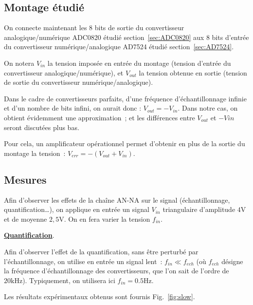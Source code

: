 \documentclass{article}
\begin{document}
\subsection{Montage étudié}

On connecte maintenant les 8 bits de sortie du convertisseur analogique/numérique ADC0820 étudié section~\ref{sec:ADC0820} aux 8 bits d'entrée du convertisseur numérique/analogique AD7524 étudié section~\ref{sec:AD7524}.

On notera $V_{in}$ la tension imposée en entrée du montage (tension d'entrée du convertisseur analogique/numérique), et $V_{out}$ la tension obtenue en sortie (tension de sortie du convertisseur numérique/analogique). 

Dans le cadre de convertisseurs parfaits, d'une fréquence d'échantillonnage infinie et d'un nombre de bits infini, on aurait donc : $V_{out}=-V_{in}$. Dans notre cas, on obtient évidemment une approximation~; et les différences entre $V_{out}$ et $-V{in}$ seront discutées plus bas.

Pour cela, un amplificateur opérationnel permet d'obtenir en plus de la sortie du montage la tension~: ${V_{err}=-(V_{out}+V_{in})}$.

\subsection{Mesures}


Afin d'observer les effets de la chaîne AN-NA sur le signal (échantillonnage, quantification\dots), on applique en entrée un signal $V_{in}$ triangulaire d'amplitude $4\mathrm{V}$ et de moyenne $2,5\mathrm{V}$. On en fera varier la tension $f_{in}$.

\noindent \textbf{\underline{Quantification}}.

Afin d'observer l'effet de la quantification, sans être perturbé par l'échantillonnage, on utilise en entrée un signal lent~: $f_{in}\ll f_{ech}$ (où $f_{ech}$ désigne la fréquence d'échantillonnage des convertisseurs, que l'on sait de l'ordre de $20\mathrm{kHz}$). Typiquement, on utilisera ici $f_{in} = \mathrm{0.5 Hz}$.

Les résultats expérimentaux obtenus sont fournis Fig.~\ref{fig:slow}.
\end{document}
